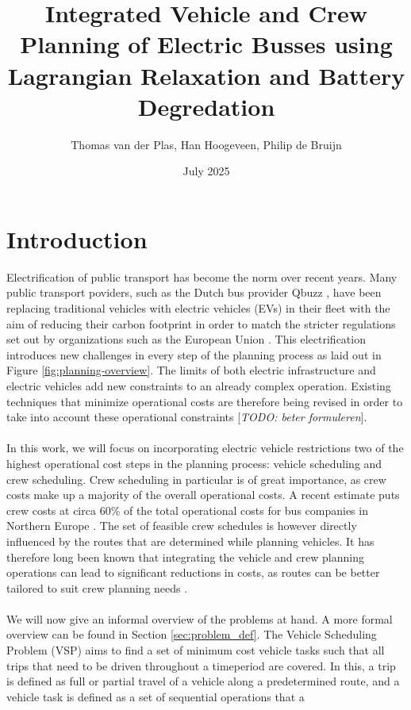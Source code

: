 \documentclass[ht]{article}
\title{Integrated Vehicle and Crew Planning of Electric Busses using Lagrangian Relaxation and Battery Degredation}
\date{July 2025}
\author{Thomas van der Plas, Han Hoogeveen, Philip de Bruijn}
\newcommand{\todo}[1]{{\color{red}[\textit{TODO: #1}]}}
\begin{document}
\maketitle

\section{Introduction}
Electrification of public transport has become the norm over recent years. Many
public transport poviders, such as the Dutch bus provider Qbuzz
\cite{qbuzzQbuzz}, have been replacing traditional vehicles with electric
vehicles (EVs) in their fleet with the aim of reducing their carbon footprint
in order to match the stricter regulations set out by organizations such as the
European Union \cite{europaRegulation20181999}. This electrification introduces
new challenges in every step of the planning process as laid out in Figure
\ref{fig:planning-overview}. The limits of both electric infrastructure and
electric vehicles add new constraints to an already complex operation. Existing
techniques that minimize operational costs are therefore being revised in order to take into account these operational constraints \todo{beter formuleren}. \\\\ In this work, we
will focus on incorporating electric vehicle restrictions two of the highest operational cost steps in the planning process: vehicle scheduling and crew
scheduling. Crew scheduling in particular is of great importance, as crew costs make
up a majority of the overall operational costs. A recent estimate puts crew
costs at circa $60\%$ of the total operational costs for bus companies in
Northern Europe \cite{Perumal2019Crew}. The set of feasible crew schedules is
however directly influenced by the routes that are determined while planning
vehicles. It has therefore long been known that integrating the vehicle and
crew planning operations can lead to significant reductions in costs, as routes
can be better tailored to suit crew planning needs \cite{Bodin1983}. \\\\ We
will now give an informal overview of the problems at hand. A more formal
overview can be found in Section \ref{sec:problem_def}. The Vehicle Scheduling
Problem (VSP) aims to find a set of minimum cost vehicle tasks such that all
trips that need to be driven throughout a timeperiod are covered. In this, a
trip is defined as full or partial travel of a vehicle along a predetermined
route, and a vehicle task is defined as a set of sequential operations that a
\end{document}
